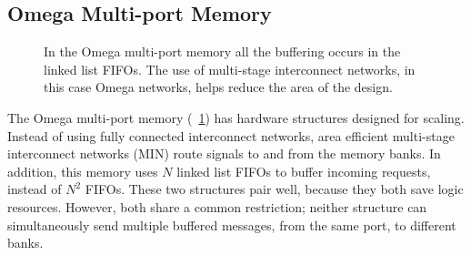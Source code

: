 \subsection{Omega Multi-port Memory}
    \begin{figure}
        \center
        \caption{In the Omega multi-port memory all the buffering occurs in the linked list FIFOs. The use of multi-stage interconnect networks, in this case Omega networks, helps reduce the area of the design.}
        \label{fig:versionb}
    \end{figure}
    The Omega multi-port memory (\figurename~\ref{fig:versionb}) has hardware structures designed for scaling. Instead of using fully connected interconnect networks, area efficient multi-stage interconnect networks (MIN) route signals to and from the memory banks. In addition, this memory uses $N$ linked list FIFOs to buffer incoming requests, instead of $N^2$ FIFOs. These two structures pair well, because they both save logic resources. However, both share a common restriction; neither structure can simultaneously send multiple buffered messages, from the same port, to different banks.


